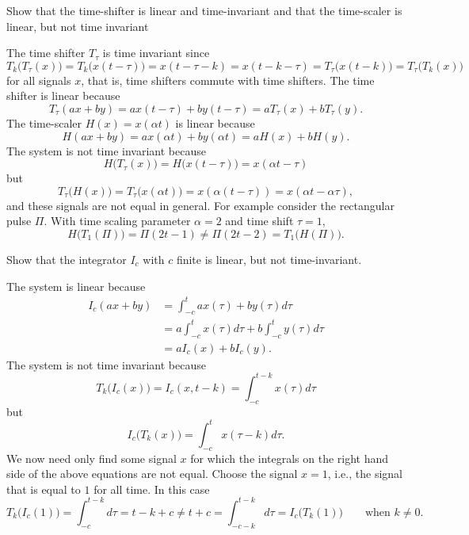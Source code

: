 \begin{excersizelist}
\item Show that the time-shifter is linear and time-invariant and that the time-scaler is linear, but not time invariant
\begin{solution}
The time shifter $T_\tau$ is time invariant since
\[
T_k\big(T_\tau(x)\big) = T_k\big(x(t - \tau)\big) = x(t - \tau - k) = x(t - k - \tau) = T_\tau\big(x(t - k)\big) = T_\tau\big(T_k(x)\big) 
\]
for all signals $x$, that is, time shifters commute with time shifters.  The time shifter is linear because
\[
T_\tau(ax + by) = ax(t - \tau) + by(t - \tau) = a T_\tau(x) + b T_\tau(y).
\]
The time-scaler $H(x) = x(\alpha t)$ is linear because
\[
H(ax + by) = ax(\alpha t) + by(\alpha t) = aH(x) + b H(y).
\]
The system is not time invariant because
\[
H\big(T_\tau(x)\big) = H\big(x(t-\tau)\big) = x(\alpha t - \tau)
\]
but 
\[
T_\tau\big(H(x)\big) = T_\tau\big(x(\alpha t) \big) = x(\alpha(t - \tau)) = x( \alpha t - \alpha \tau ),
\]
and these signals are not equal in general.  For example consider the rectangular pulse $\Pi$.  With time scaling parameter $\alpha = 2$ and time shift $\tau = 1$,
\[
H\big(T_1(\Pi)\big) = \Pi( 2 t - 1 ) \neq \Pi( 2t - 2 ) = T_1\big(H(\Pi)\big).
\]
\end{solution}


\item Show that the integrator $I_c$ with $c$ finite is linear, but not time-invariant.
\begin{solution}
The system is linear because
\begin{align*}
I_c(ax + by) &= \int_{-c}^t ax(\tau) + b y(\tau) d\tau \\
&= a\int_{-c}^t x(\tau) d\tau + b \int_{-c}^t y(\tau) d\tau \\
&= a I_c(x)  + b I_c(y).
\end{align*}
The system is not time invariant because
\[
T_k\big(I_c(x)\big) = I_c(x,t-k) = \int_{-c}^{t-k} x(\tau) d\tau 
\]
but
\[
I_c\big(T_k(x)\big) = \int_{-c}^{t} x(\tau-k) d\tau.
\]
We now need only find some signal $x$ for which the integrals on the right hand side of the above equations are not equal.  Choose the signal $x = 1$, i.e., the signal that is equal to $1$ for all time.  In this case
\[
T_k\big(I_c(1)\big) = \int_{-c}^{t-k} d\tau =  t-k+c \neq t + c = \int_{-c-k}^{t-k} d\tau = I_c\big(T_k(1)\big) \qquad \text{when $k \neq 0$.}
\]
\end{solution}


\end{excersizelist}
